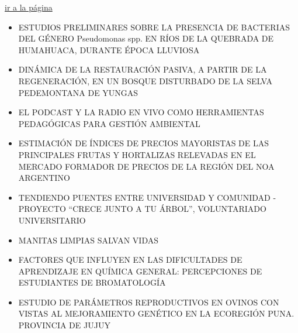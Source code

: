 \documentclass[
  spanish,
  letterpaper,
  DIV=11,
  numbers=noendperiod]{scrreprt}
\begin{document}
\begin{tcolorbox}[enhanced jigsaw, arc=.35mm, colframe=quarto-callout-note-color-frame, opacityback=0, leftrule=.75mm, titlerule=0mm, colbacktitle=quarto-callout-note-color!10!white, breakable, bottomrule=.15mm, colback=white, bottomtitle=1mm, toptitle=1mm, coltitle=black, title={Lunes 22}, left=2mm, opacitybacktitle=0.6, toprule=.15mm, rightrule=.15mm]

\href{miercoles_17.qmd}{ir a la página}

\begin{itemize}
\item
  ESTUDIOS PRELIMINARES SOBRE LA PRESENCIA DE BACTERIAS DEL GÉNERO
  Pseudomonas spp. EN RÍOS DE LA QUEBRADA DE HUMAHUACA, DURANTE ÉPOCA
  LLUVIOSA
\item
  DINÁMICA DE LA RESTAURACIÓN PASIVA, A PARTIR DE LA REGENERACIÓN, EN UN
  BOSQUE DISTURBADO DE LA SELVA PEDEMONTANA DE YUNGAS
\item
  EL PODCAST Y LA RADIO EN VIVO COMO HERRAMIENTAS PEDAGÓGICAS PARA
  GESTIÓN AMBIENTAL
\item
  ESTIMACIÓN DE ÍNDICES DE PRECIOS MAYORISTAS DE LAS PRINCIPALES FRUTAS
  Y HORTALIZAS RELEVADAS EN EL MERCADO FORMADOR DE PRECIOS DE LA REGIÓN
  DEL NOA ARGENTINO
\item
  TENDIENDO PUENTES ENTRE UNIVERSIDAD Y COMUNIDAD - PROYECTO ``CRECE
  JUNTO A TU ÁRBOL'', VOLUNTARIADO UNIVERSITARIO
\item
  MANITAS LIMPIAS SALVAN VIDAS
\item
  FACTORES QUE INFLUYEN EN LAS DIFICULTADES DE APRENDIZAJE EN QUÍMICA
  GENERAL: PERCEPCIONES DE ESTUDIANTES DE BROMATOLOGÍA
\item
  ESTUDIO DE PARÁMETROS REPRODUCTIVOS EN OVINOS CON VISTAS AL
  MEJORAMIENTO GENÉTICO EN LA ECOREGIÓN PUNA. PROVINCIA DE JUJUY
\end{itemize}

\end{tcolorbox}
\end{document}
